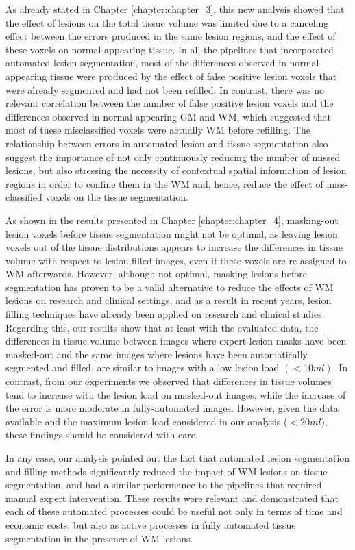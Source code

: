 As already stated in Chapter \ref{chapter:chapter_3}, this new analysis showed that the effect of lesions on the total tissue volume was limited due to a canceling effect between the errors produced in the same lesion regions, and the effect of these voxels on normal-appearing tissue. In all the pipelines that incorporated automated lesion segmentation, most of the differences observed in normal-appearing tissue were produced by the effect of false positive lesion voxels that were already segmented and had not been refilled. In contrast, there was no relevant correlation between the number of false positive lesion voxels and the differences observed in normal-appearing GM and WM, which suggested that most of these misclassified voxels were actually WM before refilling. The relationship between errors in automated lesion and tissue segmentation also suggest the importance of not only continuously reducing the number of missed lesions, but also stressing the necessity of contextual spatial information of lesion regions in order to confine them in the WM and, hence, reduce the effect of miss-classified voxels on the tissue segmentation.

As shown in the results presented in Chapter \ref{chapter:chapter_4}, masking-out lesion voxels before tissue segmentation might not be optimal, as leaving lesion voxels out of the tissue distributions appears to increase the differences in tissue volume with respect to lesion filled images, even if these voxels are re-assigned to WM afterwards. However, although not optimal, masking lesions before segmentation has proven to be a valid alternative to reduce the effects of WM lesions on research and clinical settings, and as a result in recent years, lesion filling techniques have already been applied on research and clinical studies. Regarding this, our results show that at least with the evaluated data, the differences in tissue volume between images where expert lesion masks have been masked-out and the same images where lesions have been automatically segmented and filled, are similar to images with a low lesion load $(<10ml)$. In contrast, from our experiments we observed that differences in tissue volumes tend to increase with the lesion load on masked-out images, while the increase of the error is more moderate in  fully-automated images. However, given the data available and the maximum lesion load considered in our analysis ($<20ml$), these findings should be considered with care. 

In any case, our analysis pointed out the fact that automated lesion segmentation and filling methods significantly reduced the impact of WM lesions on tissue segmentation, and had a similar performance to the pipelines that required manual expert intervention. These results were relevant and demonstrated that each of these automated processes could be useful not only in terms of time and economic costs, but also as active processes in fully automated tissue segmentation in the presence of WM lesions.

